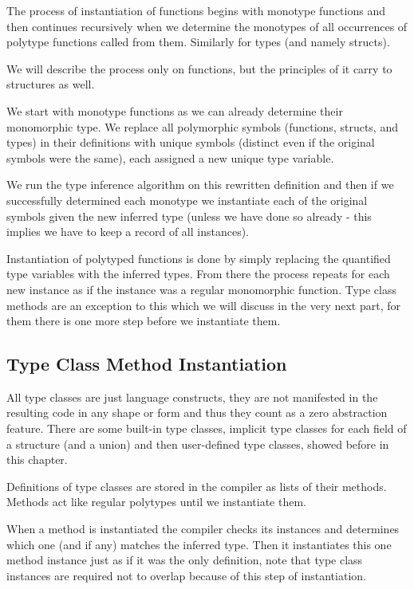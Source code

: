The process of instantiation of functions begins with monotype functions and then continues recursively when we determine the monotypes of all occurrences of polytype functions called from them. Similarly for types (and namely structs).

We will describe the process only on functions, but the principles of it carry to structures as well.

We start with monotype functions as we can already determine their monomorphic type. We replace all polymorphic symbols (functions, structs, and types) in their definitions with unique symbols (distinct even if the original symbols were the same), each assigned a new unique type variable.

We run the type inference algorithm on this rewritten definition and then if we successfully determined each monotype we instantiate each of the original symbols given the new inferred type (unless we have done so already - this implies we have to keep a record of all instances).

Instantiation of polytyped functions is done by simply replacing the quantified type variables with the inferred types. From there the process repeats for each new instance as if the instance was a regular monomorphic function. Type class methods are an exception to this which we will discuss in the very next part, for them there is one more step before we instantiate them.

\subsection{Type Class Method Instantiation}

All type classes are just language constructs, they are not manifested in the resulting code in any shape or form and thus they count as a zero abstraction feature. There are some built-in type classes, %
implicit type classes for each field of a structure (and a union) and then user-defined type classes, showed before in this chapter.

Definitions of type classes are stored in the compiler as lists of their methods. Methods act like regular polytypes until we instantiate them.

When a method is instantiated the compiler checks its instances and determines which one (and if any) matches the inferred type. Then it instantiates this one method instance just as if it was the only definition, note that type class instances are required not to overlap because of this step of instantiation.

